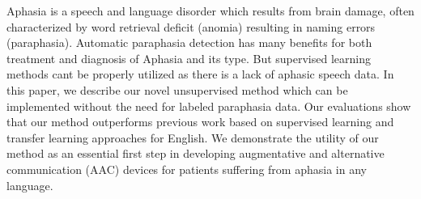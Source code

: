 Aphasia is a speech and language disorder which results from brain damage, often characterized by word retrieval deficit (anomia) resulting in naming errors (paraphasia). Automatic paraphasia detection has many benefits for both treatment and diagnosis of Aphasia and its type. But supervised learning methods cant be properly utilized as there is a lack of aphasic speech data. In this paper, we describe our novel unsupervised method which can be implemented without the need for labeled paraphasia data. Our evaluations show that our method outperforms previous work based on supervised learning and transfer learning approaches for English. We demonstrate the utility of our method as an essential first step in developing augmentative and alternative communication (AAC) devices for patients suffering from aphasia in any language.
